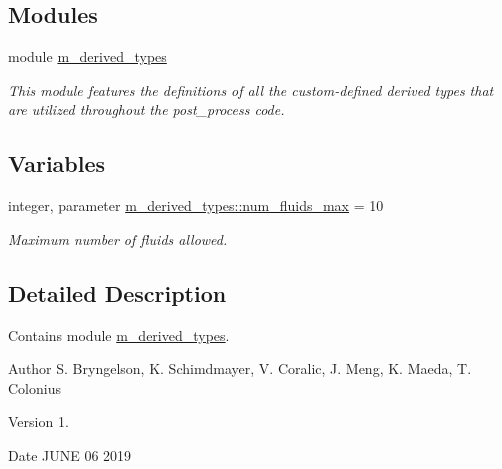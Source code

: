 \subsection*{Modules}
\begin{DoxyCompactItemize}
\item 
module \hyperlink{namespacem__derived__types}{m\+\_\+derived\+\_\+types}
\begin{DoxyCompactList}\small\item\em This module features the definitions of all the custom-\/defined derived types that are utilized throughout the post\+\_\+process code. \end{DoxyCompactList}\end{DoxyCompactItemize}
\subsection*{Variables}
\begin{DoxyCompactItemize}
\item 
integer, parameter \hyperlink{namespacem__derived__types_a3dde07670ef3e164534aa68c1830ff62}{m\+\_\+derived\+\_\+types\+::num\+\_\+fluids\+\_\+max} = 10
\begin{DoxyCompactList}\small\item\em Maximum number of fluids allowed. \end{DoxyCompactList}\end{DoxyCompactItemize}


\subsection{Detailed Description}
Contains module \hyperlink{namespacem__derived__types}{m\+\_\+derived\+\_\+types}. 

\begin{DoxyAuthor}{Author}
S. Bryngelson, K. Schimdmayer, V. Coralic, J. Meng, K. Maeda, T. Colonius 
\end{DoxyAuthor}
\begin{DoxyVersion}{Version}
1. 
\end{DoxyVersion}
\begin{DoxyDate}{Date}
J\+U\+NE 06 2019 
\end{DoxyDate}
